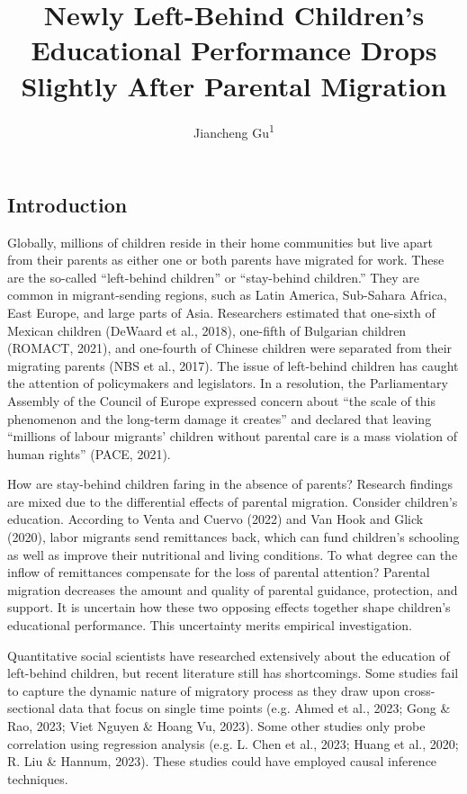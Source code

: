 \documentclass[
  man]{apa7}
\title{Newly Left-Behind Children's Educational Performance Drops Slightly After Parental Migration}
\author{Jiancheng Gu\textsuperscript{1}}
\date{}
\affiliation{\vspace{0.5cm}\textsuperscript{1} Department for Migration and Globalisation, Universität für Weiterbildung Krems}
\begin{document}
\maketitle

\hypertarget{introduction}{%
\subsection{Introduction}\label{introduction}}

Globally, millions of children reside in their home communities but live apart from their parents as either one or both parents have migrated for work. These are the so-called ``left-behind children'' or ``stay-behind children.'' They are common in migrant-sending regions, such as Latin America, Sub-Sahara Africa, East Europe, and large parts of Asia. Researchers estimated that one-sixth of Mexican children (DeWaard et al., 2018), one-fifth of Bulgarian children (ROMACT, 2021), and one-fourth of Chinese children were separated from their migrating parents (NBS et al., 2017). The issue of left-behind children has caught the attention of policymakers and legislators. In a resolution, the Parliamentary Assembly of the Council of Europe expressed concern about ``the scale of this phenomenon and the long-term damage it creates'' and declared that leaving ``millions of labour migrants' children without parental care is a mass violation of human rights'' (PACE, 2021).

How are stay-behind children faring in the absence of parents? Research findings are mixed due to the differential effects of parental migration. Consider children's education. According to Venta and Cuervo (2022) and Van Hook and Glick (2020), labor migrants send remittances back, which can fund children's schooling as well as improve their nutritional and living conditions. To what degree can the inflow of remittances compensate for the loss of parental attention? Parental migration decreases the amount and quality of parental guidance, protection, and support. It is uncertain how these two opposing effects together shape children's educational performance. This uncertainty merits empirical investigation.

Quantitative social scientists have researched extensively about the education of left-behind children, but recent literature still has shortcomings. Some studies fail to capture the dynamic nature of migratory process as they draw upon cross-sectional data that focus on single time points (e.g. Ahmed et al., 2023; Gong \& Rao, 2023; Viet Nguyen \& Hoang Vu, 2023). Some other studies only probe correlation using regression analysis (e.g. L. Chen et al., 2023; Huang et al., 2020; R. Liu \& Hannum, 2023). These studies could have employed causal inference techniques.
\end{document}
